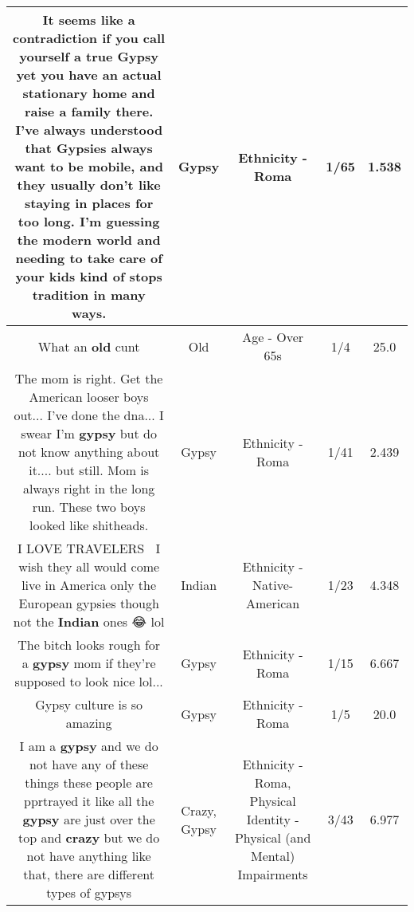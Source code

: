 \documentclass[11pt]{article}
\newlength\mylength
\begin{document}
\begin{center}
\begin{longtable}{|C{.65\mylength}|C{.30\mylength}|C{.12\mylength}|C{.12\mylength}|C{.12\mylength}|}
  \small It seems like a contradiction if you call yourself a true \textbf{Gypsy} yet you have an actual stationary home and raise a family there.  I've always understood that Gypsies always want to be mobile, and they usually don't like staying in places for too long.  I'm guessing the modern world and needing to take care of your kids kind of stops tradition in many ways.\normalsize   & Gypsy & Ethnicity - Roma & 1/65 & 1.538 \\  \hline
  \small What an \textbf{old} cunt\normalsize   & Old & Age - Over 65s & 1/4 & 25.0 \\  \hline
  \small The mom is right. Get the American looser boys out... I've done the dna...  I swear I'm \textbf{gypsy} but do not know anything about it.... but still. Mom is always right in the long run. These two boys looked like shitheads.\normalsize   & Gypsy & Ethnicity - Roma & 1/41 & 2.439 \\  \hline
  \small I LOVE TRAVELERS🤚🏻 I wish they all would come live in America only the European gypsies though not the \textbf{Indian} ones 😂 lol\normalsize   & Indian & Ethnicity - Native-American & 1/23 & 4.348 \\  \hline
  \small The bitch looks rough for a \textbf{gypsy} mom if they're supposed to look nice lol...\normalsize   & Gypsy & Ethnicity - Roma & 1/15 & 6.667 \\  \hline
  \small Gypsy culture is so amazing\normalsize   & Gypsy & Ethnicity - Roma & 1/5 & 20.0 \\  \hline
  \small I am a \textbf{gypsy} and we do not have any of these things these people are pprtrayed it like all the \textbf{gypsy} are just over the top and \textbf{crazy} but we do not have anything like that, there are different types of gypsys\normalsize   & Crazy, Gypsy & Ethnicity - Roma, Physical Identity - Physical (and Mental) Impairments & 3/43 & 6.977 \\  \hline

\end{longtable}
\end{center}
\end{document}
